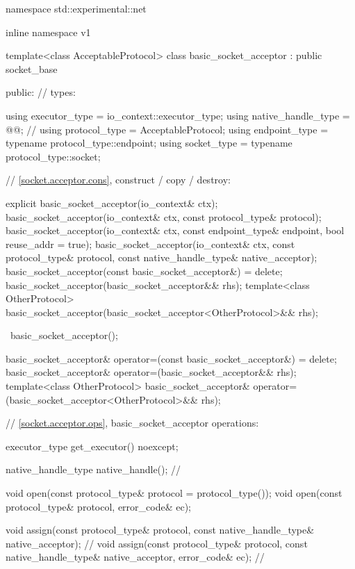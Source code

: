 \begin{codeblock}
namespace std::experimental::net {
inline namespace v1 {

  template<class AcceptableProtocol>
  class basic_socket_acceptor : public socket_base
  {
  public:
    // types:

    using executor_type = io_context::executor_type;
    using native_handle_type = @@; // \nativeref
    using protocol_type = AcceptableProtocol;
    using endpoint_type = typename protocol_type::endpoint;
    using socket_type = typename protocol_type::socket;

    // \ref{socket.acceptor.cons}, construct / copy / destroy:

    explicit basic_socket_acceptor(io_context& ctx);
    basic_socket_acceptor(io_context& ctx, const protocol_type& protocol);
    basic_socket_acceptor(io_context& ctx, const endpoint_type& endpoint,
                          bool reuse_addr = true);
    basic_socket_acceptor(io_context& ctx, const protocol_type& protocol,
                          const native_handle_type& native_acceptor);
    basic_socket_acceptor(const basic_socket_acceptor&) = delete;
    basic_socket_acceptor(basic_socket_acceptor&& rhs);
    template<class OtherProtocol>
      basic_socket_acceptor(basic_socket_acceptor<OtherProtocol>&& rhs);

    ~basic_socket_acceptor();

    basic_socket_acceptor& operator=(const basic_socket_acceptor&) = delete;
    basic_socket_acceptor& operator=(basic_socket_acceptor&& rhs);
    template<class OtherProtocol>
      basic_socket_acceptor& operator=(basic_socket_acceptor<OtherProtocol>&& rhs);

    // \ref{socket.acceptor.ops}, basic_socket_acceptor operations:

    executor_type get_executor() noexcept;

    native_handle_type native_handle(); // \nativeref

    void open(const protocol_type& protocol = protocol_type());
    void open(const protocol_type& protocol, error_code& ec);

    void assign(const protocol_type& protocol,
                const native_handle_type& native_acceptor); // \nativeref
    void assign(const protocol_type& protocol,
                const native_handle_type& native_acceptor,
                error_code& ec); // \nativeref

}}}
\end{codeblock}
